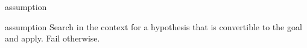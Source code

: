 \begin{tactic}{assumption}
  \begin{tsyntax}[empty]{assumption}
  Search in the context for a hypothesis that is convertible to the goal
  and apply. Fail otherwise.
  \end{tsyntax}
\end{tactic}
